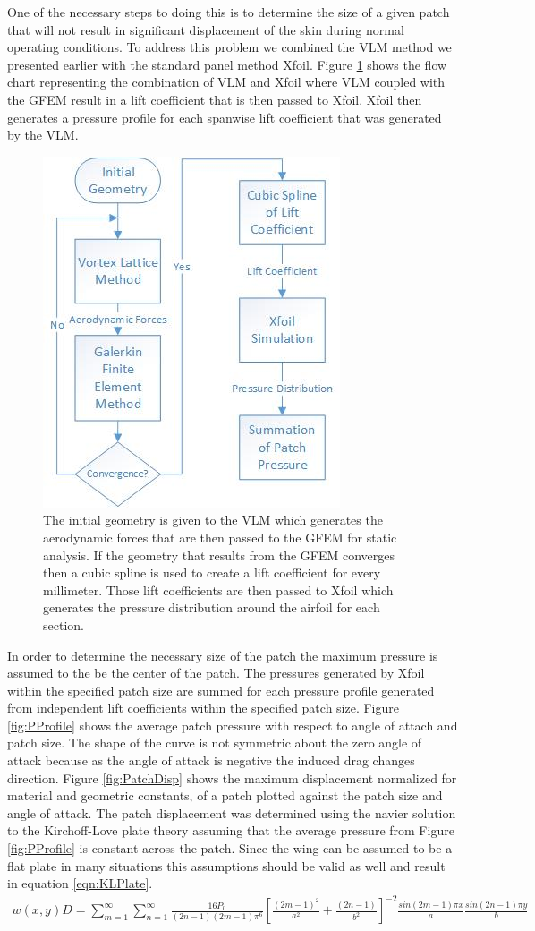 \documentclass[11pt]{ucthesis}
\begin{document}
One of the necessary steps to doing this is to determine the size of a given patch that will not result in significant displacement of the skin during normal operating conditions. To address this problem we combined the VLM method we presented earlier with the standard panel method Xfoil. Figure \ref{fig:PPFlow} shows the flow chart representing the combination of VLM and Xfoil where VLM coupled with the GFEM result in a lift coefficient that is then passed to Xfoil. Xfoil then generates a pressure profile for each spanwise lift coefficient that was generated by the VLM.
\begin{figure}[thpb]
\centering
\includegraphics[width=0.3\linewidth]{Figures/PatchPressureFlowChart.jpg}
\caption{The initial geometry is given to the VLM which generates the aerodynamic forces that are then passed to the GFEM for static analysis. If the geometry that results from the GFEM converges then a cubic spline is used to create a lift coefficient for every millimeter. Those lift coefficients are then passed to Xfoil which generates the pressure distribution around the airfoil for each section.}
\label{fig:PPFlow}
\end{figure}

In order to determine the necessary size of the patch the maximum pressure is assumed to the be the center of the patch. The pressures generated by Xfoil  within the specified patch size are summed for each pressure profile generated from independent lift coefficients within the specified patch size. Figure \ref{fig:PProfile} shows the average patch pressure with respect to angle of attach and patch size. The shape of the curve is not symmetric about the zero angle of attack because as the angle of attack is negative the induced drag changes direction. Figure \ref{fig:PatchDisp} shows the maximum displacement normalized for material and geometric constants, of a patch plotted against the patch size and angle of attack. The patch displacement was determined using the navier solution to the Kirchoff-Love plate theory assuming that the average pressure from Figure \ref{fig:PProfile} is constant across the patch. Since the wing can be assumed to be a flat plate in many situations this assumptions should be valid as well and result in equation \ref{eqn:KLPlate}.
\small
\begin{eqnarray}
w(x,y)D = \sum_{m=1}^{\infty}\sum_{n=1}^{\infty}\frac{16P_0}{(2n-1)(2m-1)\pi^6}\left[\frac{(2m-1)^2}{a^2}+\frac{(2n-1)}{b^2}\right]^{-2}\frac{sin(2m-1)\pi x}{a}\frac{sin(2n-1)\pi y}{b}
\label{eqn:KLPlate}
\end{eqnarray}
\normalsize
\end{document}
